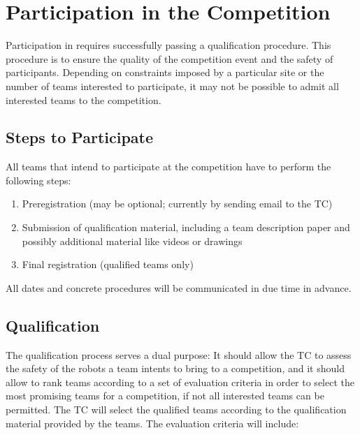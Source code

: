 \section{Participation in the Competition}\label{sec:participation_in_the_competition}
Participation in \RCAW requires successfully passing a qualification procedure. This procedure is to ensure the quality of the competition event and the safety of participants. Depending on constraints imposed by a particular site or the number of teams interested to participate, it may not be possible to admit all interested teams to the competition.
 
\subsection{Steps to Participate}
All teams that intend to participate at the competition have to perform the following steps:

\begin{enumerate}
	\item Preregistration (may be optional; currently by sending email to the TC)
	\item Submission of qualification material, including a team description 				paper and possibly additional material like videos or drawings
	\item Final registration (qualified teams only)
\end{enumerate}


All dates and concrete procedures will be communicated in due time in advance.

\subsection{Qualification}
The qualification process serves a dual purpose: It should allow the TC to assess the safety of the robots a team intents to bring to a competition, and it should allow to rank teams according to a set of evaluation criteria in order to select the most promising teams for a competition, if not all interested teams can be permitted. The TC will select the qualified teams according to the qualification material provided by the teams. The evaluation criteria will include:

